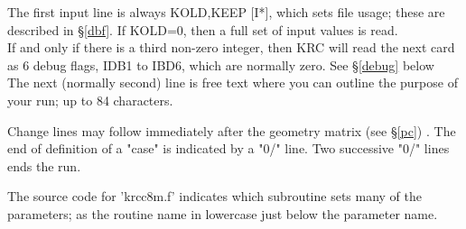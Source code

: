 \documentclass{article}
\newcommand{\qi}{\\ \hspace*{2.em}}      %
\begin{document}
The first input line is always KOLD,KEEP [I*], which sets file usage; these are
described in \S \ref{dbf}. If KOLD=0, then a full set of input values is read.
\qi If and only if there is a third non-zero integer, then KRC will read the next
card as 6 debug flags, IDB1 to IBD6, which are normally zero.
  See \S \ref{debug} below \\
The next (normally second) line is free text where you can outline the purpose 
of your run; up to 84 characters.

Change lines may follow immediately after the geometry matrix (see \S \ref{pc})
. The end of definition of a "case" is indicated by a "0/" line. Two successive
"0/" lines ends the run.

The source code for 'krcc8m.f' indicates which subroutine sets many of the 
parameters; as the routine name in lowercase just below the parameter name.
\vspace{-3.mm} 
\end{document}
